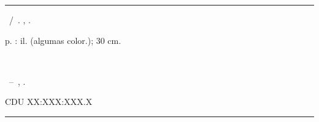 \imprimircapa
\imprimirfolhadeaprovacao
\imprimirfolhaderosto


%
%     
\begin{fichacatalografica}
	\vspace*{\fill}					%
	\hrule							%
	\begin{center}					%
		\begin{minipage}[c]{12.5cm}		%
			\setlength{\parskip}{1em}

			\imprimirautor
		
			\hspace{0.5cm} \imprimirtitulo~/~\imprimirautor. \imprimirlocal, \imprimirdata.

			\hspace{0.5cm} \pageref{LastPage} p. : il. (algumas color.); 30 cm.
		
			\hspace{0.5cm} \imprimirorientadorRotulo~\imprimirorientador
		
			\hspace{0.5cm} \parbox[t]{\textwidth}{\imprimirtipotrabalho~--~\imprimirinstituicao, \imprimirdata.}
		
			\hspace{0.5cm}
		
			\hspace{8.75cm} CDU XX:XXX:XXX.X\\
	
		\end{minipage}
	\end{center}
	\hrule
\end{fichacatalografica}



